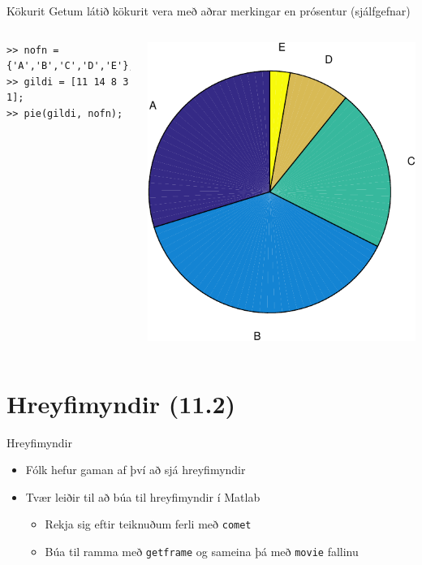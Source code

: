 \documentclass{beamer}
\begin{document}
\begin{frame}[fragile]{Kökurit}
\vspace{1.5cm}
Getum látið kökurit vera með aðrar merkingar en prósentur (sjálfgefnar)
\begin{columns}
\vspace{-0.5cm}
\begin{verbatim}
>> nofn = {'A','B','C','D','E'};
>> gildi = [11 14 8 3 1];
>> pie(gildi, nofn);
\end{verbatim}

\includegraphics[width=\linewidth]{Pics/pie-names}
\end{columns}
\end{frame}

\section{Hreyfimyndir (11.2)}

\begin{frame}{Hreyfimyndir}
\begin{itemize}
 \item Fólk hefur gaman af því að sjá hreyfimyndir
 \item Tvær leiðir til að búa til hreyfimyndir í Matlab
 \begin{itemize}
  \item Rekja sig eftir teiknuðum ferli með \texttt{comet}
  \item Búa til ramma með \texttt{getframe} og sameina þá með \texttt{movie} fallinu
 \end{itemize}
\end{itemize}
\end{frame}
\end{document}
